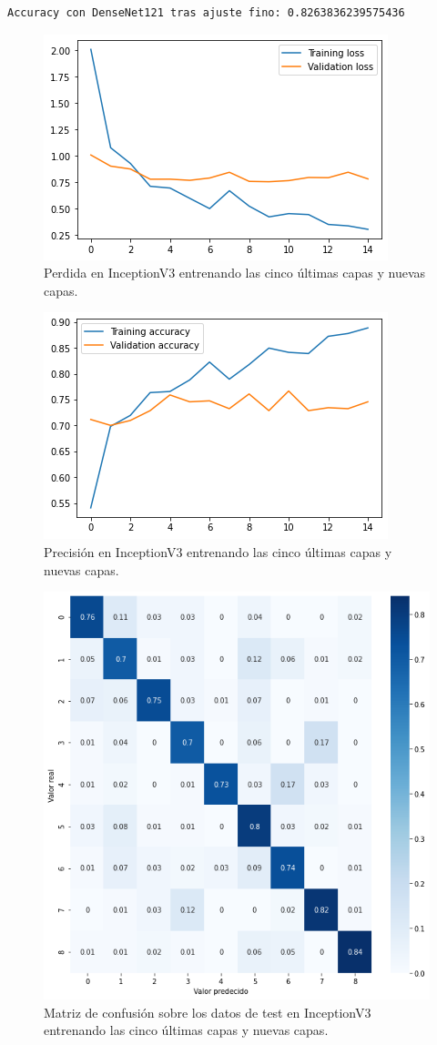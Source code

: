 \begin{lstlisting}
Accuracy con DenseNet121 tras ajuste fino: 0.8263836239575436
\end{lstlisting}






\begin{figure}[H]
  \centering
  \includegraphics[width=0.5\linewidth]{Imagenes/entrenamiento_redes/5-ult/inception_5ult_loss.png}
  \caption{Perdida en InceptionV3 entrenando las cinco últimas capas y nuevas capas.}
\end{figure}

\begin{figure}[H]
  \centering
  \includegraphics[width=0.5\linewidth]{Imagenes/entrenamiento_redes/5-ult/inception_5ult_acc.png}
  \caption{Precisión en InceptionV3 entrenando las cinco últimas capas y nuevas capas.}
\end{figure}

\begin{figure}[H]
  \centering
  \includegraphics[width=0.5\linewidth]{Imagenes/entrenamiento_redes/5-ult/inception_5ult_matriz.png}
  \caption{Matriz de confusión sobre los datos de test en InceptionV3 entrenando las cinco últimas capas y nuevas capas.}
\end{figure}


